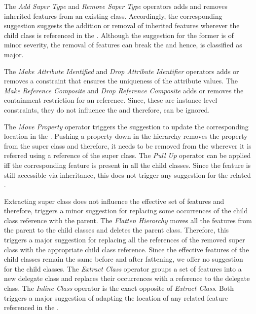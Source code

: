 The \textit{Add Super Type} and \textit{Remove Super Type} operators adds and removes inherited features from an existing class. Accordingly, the corresponding suggestion suggests the addition or removal of inherited features wherever the child class is referenced in the \viewtype. Although the suggestion for the former is of minor severity, the removal of features can break the \viewtype and hence, is classified as major.

The \textit{Make Attribute Identified} and \textit{Drop Attribute Identifier} operators adds or removes a constraint that ensures the uniqueness of the attribute values. The \textit{Make Reference Composite} and \textit{Drop Reference Composite} adds or removes the containment restriction for an reference. Since, these are instance level constraints, they do not influence the \viewtype and therefore, can be ignored.

 

The \textit{Move Property} operator triggers the suggestion to update the corresponding location in the \viewtype. Pushing a property down in the hierarchy removes the property from the super class and therefore, it needs to be removed from the \viewtype wherever it is referred using a reference of the super class. The \textit{Pull Up} operator can be applied iff the corresponding feature is present in all the child classes. Since the feature is still accessible via inheritance, this does not trigger any suggestion for the related \viewtypes.

Extracting super class does not influence the effective set of features and therefore, triggers a minor suggestion for replacing some occurrences of the child class reference with the parent. The \textit{Flatten Hierarchy} moves all the features from the parent to the child classes and deletes the parent class. Therefore, this triggers a major suggestion for replacing all the references of the removed super class with the appropriate child class reference. Since the effective features of the child classes remain the same before and after fattening, we offer no suggestion for the child classes. The \textit{Extract Class} operator groups a set of features into a new delegate class and replaces their occurrences with a reference to the delegate class. The \textit{Inline Class} operator is the exact opposite of \textit{Extract Class}. Both triggers a major suggestion of adapting the location of any related feature referenced in the \viewtype.

